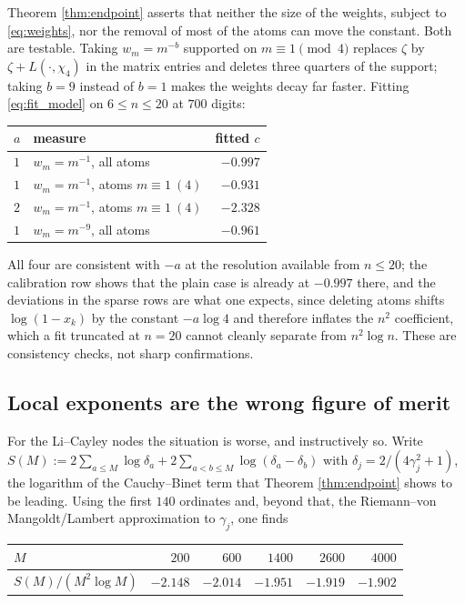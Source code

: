 \documentclass[11pt]{amsart}
\numberwithin{equation}{section}
\theoremstyle{plain}
\theoremstyle{definition}
\theoremstyle{remark}
\begin{document}
Theorem \ref{thm:endpoint} asserts that neither the size of the weights, subject to
\eqref{eq:weights}, nor the removal of most of the atoms can move the constant. Both are testable.
Taking $w_{m}=m^{-b}$ supported on $m\equiv1\pmod4$ replaces $\zeta$ by $\zeta+L(\cdot,\chi_{4})$ in
the matrix entries and deletes three quarters of the support; taking $b=9$ instead of $b=1$ makes
the weights decay far faster. Fitting \eqref{eq:fit_model} on $6\le n\le20$ at $700$ digits:

\begin{center}
\begin{tabular}{llr}
\toprule
$a$ & measure & fitted $c$\\
\midrule
$1$ & $w_{m}=m^{-1}$, all atoms & $-0.997$\\
$1$ & $w_{m}=m^{-1}$, atoms $m\equiv1\ (4)$ & $-0.931$\\
$2$ & $w_{m}=m^{-1}$, atoms $m\equiv1\ (4)$ & $-2.328$\\
$1$ & $w_{m}=m^{-9}$, all atoms & $-0.961$\\
\bottomrule
\end{tabular}
\end{center}

All four are consistent with $-a$ at the resolution available from $n\le20$; the calibration row
shows that the plain case is already at $-0.997$ there, and the deviations in the sparse rows are
what one expects, since deleting atoms shifts $\log(1-x_{k})$ by the constant $-a\log4$ and
therefore inflates the $n^{2}$ coefficient, which a fit truncated at $n=20$ cannot cleanly separate
from $n^{2}\log n$. These are consistency checks, not sharp confirmations.

\subsection{Local exponents are the wrong figure of merit}

For the Li--Cayley nodes the situation is worse, and instructively so. Write
$S(M):=2\sum_{a\le M}\log\delta_{a}+2\sum_{a<b\le M}\log(\delta_{a}-\delta_{b})$ with
$\delta_{j}=2/(4\gamma_{j}^{2}+1)$, the logarithm of the Cauchy--Binet term that Theorem
\ref{thm:endpoint} shows to be leading. Using the first $140$ ordinates and, beyond that, the
Riemann--von Mangoldt/Lambert approximation to $\gamma_{j}$, one finds

\begin{center}
\begin{tabular}{lrrrrr}
\toprule
$M$ & $200$ & $600$ & $1400$ & $2600$ & $4000$\\
\midrule
$S(M)/(M^{2}\log M)$ & $-2.148$ & $-2.014$ & $-1.951$ & $-1.919$ & $-1.902$\\
\bottomrule
\end{tabular}
\end{center}
\end{document}
